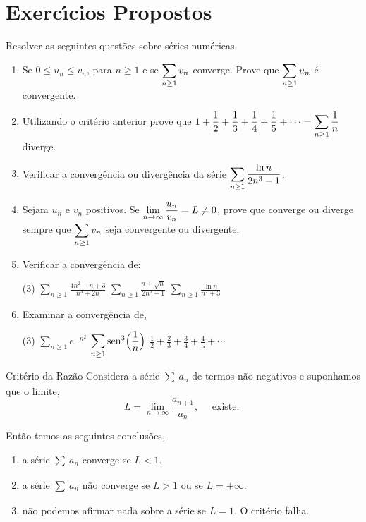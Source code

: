 \section*{Exerc\'{\i}cios Propostos} 
Resolver as seguintes quest\~{o}es sobre s\'{e}ries num\'{e}ricas
\begin{enumerate}[label=\rm{(\arabic*)}]
\item Se $0\leq u_n\leq v_n$, para $n\geq 1$ e se
$\displaystyle{\sum_{n\geq 1}v_n}$ converge. Prove que $\displaystyle{\sum_{n\geq
1}u_n}$ \'e convergente.
\item Utilizando o crit\'erio anterior prove que $\displaystyle{1+\frac{1}{2}+\frac{1}{3}+\frac{1}{4}+
\frac{1}{5}+\cdots=\sum_{n\geq 1}\frac{1}{n}}$ diverge.
\item Verificar a converg\^encia ou diverg\^encia da s\'erie $\displaystyle{\sum_{n\geq
1}\frac{\ln n}{2n^3-1}}$.
\item Sejam $u_n$ e $v_n$ positivos. Se
$\displaystyle{\lim_{n\to\infty}\frac{u_n}{v_n}=L\not=0}$, prove que
converge ou diverge sempre que $\displaystyle{\sum_{n\geq1}v_n}$ seja
convergente ou divergente.

\item Verificar a converg\^encia de:
\begin{tasks}[label=(\alph*),item-indent=6em,label-width=4ex,ref=(\alph*)](3)
\task \(\displaystyle{\sum_{n\geq 1}\frac{4n^2-n+3}{n^3+2n}}\)
\task \(\displaystyle{\sum_{n\geq 1}\frac{n+\sqrt{n}}{2n^3-1}}\)
\task \(\displaystyle{\sum_{n\geq 1}\frac{\ln n }{n^2+3}}\)
\end{tasks}


\item  Examinar a converg\^encia de,
\begin{tasks}[label=(\alph*),item-indent=3em,label-width=4ex,ref=(\alph*)](3)
\task \(\displaystyle{\sum_{n\geq1}e^{-n^2}}\)
\task \(\displaystyle{\sum_{n\geq 1}\operatorname{sen}^3\Bigl(\frac{1}{n}\Bigr)}\)
\task \(\displaystyle{\frac{1}{2}+\frac{2}{3}+\frac{3}{4}+\frac{4}{5}+\cdots}\)
\end{tasks}
\end{enumerate}

\begin{theoc}{Crit\'{e}rio da Raz\~{a}o}{}
Considera a s\'{e}rie $\sum_{}\,a_{n}$ de termos n\~{a}o
negativos e suponhamos que o limite,
\begin{equation*}
  L=\lim_{n\to\infty}\frac{a_{n+1}}{a_n},\quad \text{ existe. }
\end{equation*}

Ent\~{a}o temos as seguintes conclus\~{o}es,
\begin{enumerate}[label=\rm{(\alph*)},leftmargin=4em,ref=\rm{(\alph*)}]
\item a s\'{e}rie $\sum_{}\,a_{n}$ converge se $L<1$.
\item a s\'{e}rie $\sum_{}\,a_{n}$ n\~{a}o converge se $L>1$ ou se $L=+\infty$.
\item n\~{a}o podemos afirmar nada sobre a s\'{e}rie se $L=1$. O critério falha.
\end{enumerate}
\end{theoc}

